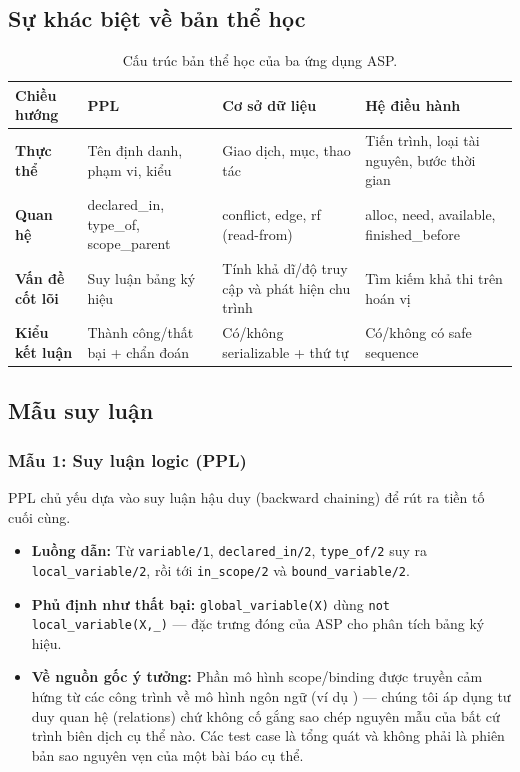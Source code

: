 \documentclass[a4paper,11pt]{article}
\begin{document}
\subsection{Sự khác biệt về bản thể học}

\begin{table}[H]
\centering
\small
\begin{tabular}{|l|p{3cm}|p{3cm}|p{3cm}|}
\hline
\textbf{Chiều hướng} & \textbf{PPL} & \textbf{Cơ sở dữ liệu} & \textbf{Hệ điều hành} \\
\hline
\textbf{Thực thể} &
  Tên định danh, phạm vi, kiểu &
  Giao dịch, mục, thao tác &
  Tiến trình, loại tài nguyên, bước thời gian \\
\hline
\textbf{Quan hệ} &
  declared\_in, type\_of, scope\_parent &
  conflict, edge, rf (read-from) &
  alloc, need, available, finished\_before \\
\hline
\textbf{Vấn đề cốt lõi} &
  Suy luận bảng ký hiệu &
  Tính khả dĩ/độ truy cập và phát hiện chu trình &
  Tìm kiếm khả thi trên hoán vị \\
\hline
\textbf{Kiểu kết luận} &
  Thành công/thất bại + chẩn đoán &
  Có/không serializable + thứ tự &
  Có/không có safe sequence \\
\hline
\end{tabular}
\caption{Cấu trúc bản thể học của ba ứng dụng ASP.}
\label{tab:ontology}
\end{table}

\subsection{Mẫu suy luận}

\subsubsection*{Mẫu 1: Suy luận logic (PPL)}

PPL chủ yếu dựa vào suy luận hậu duy (backward chaining) để rút ra tiền tố cuối cùng.
\begin{itemize}
  \item \textbf{Luồng dẫn:} Từ \texttt{variable/1}, \texttt{declared\_in/2}, \texttt{type\_of/2} suy ra \texttt{local\_variable/2},
        rồi tới \texttt{in\_scope/2} và \texttt{bound\_variable/2}.
  \item \textbf{Phủ định như thất bại:} \texttt{global\_variable(X)} dùng \texttt{not local\_variable(X,\_)} — đặc trưng đóng
        của ASP cho phân tích bảng ký hiệu.
  \item \textbf{Về nguồn gốc ý tưởng:} Phần mô hình scope/binding được truyền cảm hứng từ các công trình về mô hình ngôn ngữ (ví dụ
        \cite{Gabbrielli2023}) — chúng tôi áp dụng tư duy quan hệ (relations) chứ không cố gắng sao chép nguyên mẫu của bất cứ trình biên dịch
        cụ thể nào. Các test case là tổng quát và không phải là phiên bản sao nguyên vẹn của một bài báo cụ thể.
\end{itemize}
\end{document}
